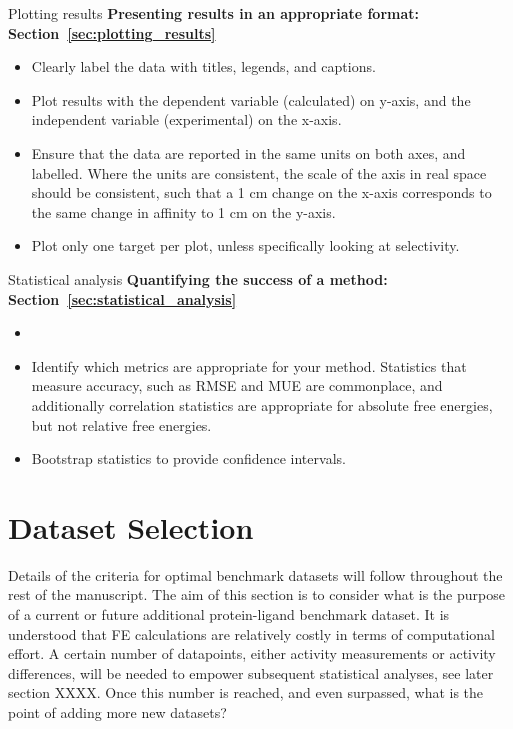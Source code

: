 \documentclass[9pt,bestpractices]{livecoms}
\begin{document}
\begin{Checklists*}


\begin{checklist}{Plotting results}
\textbf{Presenting results in an appropriate format: Section~\ref{sec:plotting_results}}
\begin{itemize}
\item Clearly label the data with titles, legends, and captions.
\item Plot results with the dependent variable (calculated) on y-axis, and the independent variable (experimental) on the x-axis. 
\item Ensure that the data are reported in the same units on both axes, and labelled. Where the units are consistent, the scale of the axis in real space should be consistent, such that a 1 cm change on the x-axis corresponds to the same change in affinity to 1 cm on the y-axis.
\item Plot only one target per plot, unless specifically looking at selectivity.
\end{itemize}
\end{checklist}

\begin{checklist}{Statistical analysis}
\textbf{Quantifying the success of a method: Section~\ref{sec:statistical_analysis}}
\begin{itemize}
\item 
\item Identify which metrics are appropriate for your method. Statistics that measure accuracy, such as RMSE and MUE are commonplace, and additionally correlation statistics are appropriate for absolute free energies, but not relative free energies.
\item Bootstrap statistics to provide confidence intervals. 
\end{itemize}
\end{checklist}


\end{Checklists*}






\section{Dataset Selection}

Details of the criteria for optimal benchmark datasets will follow throughout the rest of the manuscript. The aim of this section is to consider what is the purpose of a current or future additional protein-ligand benchmark dataset. It is understood that FE calculations are relatively costly in terms of computational effort. A certain number of datapoints, either activity measurements or activity differences, will be needed to empower subsequent statistical analyses, see later section XXXX. Once this number is reached, and even surpassed, what is the point of adding more new datasets? 
\end{document}
